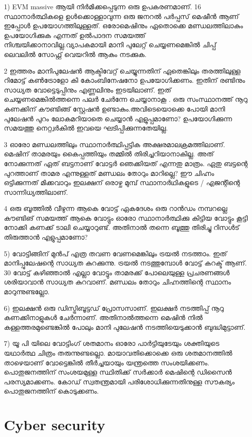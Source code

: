 \documentclass[10pt,a4paper]{report}
\begin{document}
     1) EVM massive ആയി നിർമിക്കപ്പെടുന്ന ഒരു ഉപകരണമാണ്. 16 സ്ഥാനാർത്ഥികളെ ഉൾക്കൊള്ളാവുന്ന ഒരു ജനറൽ പർപ്പസ് മെഷീൻ ആണ് ഇപ്പോൾ ഉപയോഗത്തിലുള്ളത്. ഒരോമെഷിനും ഏതൊക്കെ മണ്ഡലത്തിലാകും ഉപയോഗിക്കുക എന്നത് ഉൽപാദന സമയത്ത് നിശ്ചയിക്കാനാവില്ല.വ്യാപകമായി മാനി പുലേറ്റ് ചെയ്യണമെങ്കിൽ ചിപ്പ് ലെവലിൽ സോഫ്റ്റ് വെയറിൽ ആകും നടക്കുക.
     
      2 ഇത്തരം മാനിപുലേഷൻ ആക്ടിവേറ്റ് ചെയ്യുന്നതിന് ഏതെങ്കിലും തരത്തിലുള്ള റിമോട്ട് കൺട്രോളോ കി കോംബിനേഷനോ ഉപയോഗിക്കണം. ഇതിന് രണ്ടിനും സാധ്യത വോട്ടെടുപ്പിനും എണ്ണലിനും ഇടയിലാണ്. ഇത് ചെയ്യണമെങ്കിൽത്തന്നെ പലർ ചേർന്നേ ചെയ്യാനാകൂ . ഒരു സംസ്ഥാനത്ത് നൂറു കണക്കിന് കൗണ്ടിങ്ങ് സ്റ്റേഷൻ ഉണ്ടാകും.അവിടെയൊക്കെ പോയി മാനി പുലേഷൻ പുറം ലോകമറിയാതെ ചെയ്യാൻ എളുപ്പമാണോ? ഉപയോഗിക്കുന്ന സമയത്തു നെറ്റ്വർകിൽ ഇവയെ ഘടിപ്പിക്കുന്നതേയില്ല. 
      
      3 ഓരോ മണ്ഡലത്തിലും സ്ഥാനാർത്ഥിപ്പട്ടിക അക്ഷരമാലക്രമത്തിലാണ്. മെഷിന് താമരയും കൈപ്പത്തിയും തമ്മിൽ തിരിച്ചറിയാനാകില്ല. അത് നോക്കുന്നത് ഏത് ബട്ടനാണ് വോട്ടർ ഞെക്കിയത് എന്നതു മാത്രം. ഏതു ബട്ടന്റെ പുറത്താണ് താമര എന്നുള്ളത് മണ്ഡലം തോറും മാറില്ലെ? ഈ ചിഹ്നം ഒട്ടിക്കുന്നത് മിക്കവാറും ഇലക്ഷന് ഒരാഴ്ച മുമ്പ് സ്ഥാനാർഥികളുടെ / എജന്റിന്റെ സാന്നിധ്യത്തിലാണ്‌. 
      
      4 ഒരു ബൂത്തിൽ വീഴുന്ന ആകെ വോട്ട് ഏകദേശം ഒരു റാൻഡം നമ്പറല്ലെ കൗണ്ടിങ് സമയത്ത് ആകെ വോട്ടും ഓരോ സ്ഥാനാർത്ഥിക്കു കിട്ടിയ വോട്ടും കൂട്ടി നോക്കി കണക്ക് ടാലി ചെയ്യാറുണ്ട്. അതിനാൽ തന്നെ ബൂത്തു തിരിച്ചു റിസൾട് തിരുത്താൻ എളുപ്പമാണോ? 
      
      5) വോട്ടിങ്ങിന് മുൻപ് എത്ര തവണ വേണമെങ്കിലും ട്രയൽ നടത്താം. ഇത് മാനിപ്പുലേഷന്റെ സാധ്യത കുറക്കുന്നു. ട്രയൽ നടത്തുമ്പോൾ വോട്ട് കറക്ട് ആണ്. 30 വോട്ട് കഴിഞ്ഞാൽ എല്ലാ വോട്ടും താമരക്ക് പോലെയുള്ള പ്രചരണങ്ങൾ ശരിയാവാൻ സാധ്യത കുറവാണ്. മണ്ഡലം തോറും ചിഹ്നത്തിന്റെ സ്ഥാനം മാറുന്നുണ്ടല്ലോ. 
      
      6) ഇലക്ഷൻ ഒരു ഡിസ്ട്രിബൂട്ടഡ് പ്രോസസാണ്. ഇലക്ഷർ നടത്തിപ്പ് നൂറു കണക്കിനാളുകൾ ചേർന്നാണ്. അതിനാൽത്തന്നെ മെഷിൻ നിൽ കള്ളത്തരമുണ്ടെങ്കിൽ പോലും മാനി പുലേഷൻ നടത്തിയെടുക്കാൻ ബുദ്ധിമുട്ടാണ്. 
      
      7) യൂ പി യിലെ വോട്ടിംഗ് ശതമാനം ഓരോ പാർട്ടിയുടേയും ശക്തിയുടെ യഥാർത്ഥ ചിത്രം തരുന്നുണ്ടല്ലൊ. മായാവതിക്കൊക്കെ ഒരു ശതമാനത്തിൽ താഴെയാണ് വോട്ടെങ്കിൽ തീർച്ചയായും യന്ത്രത്തെ സംശയിക്കണം. പൊതുജനത്തിന് സംശയമുള്ള സ്ഥിതിക്ക് സർക്കാർ മെഷിന്റെ ഡിസൈൻ പരസ്യമാക്കണം. കോഡ് സ്വതന്ത്രമായി പരിശോധിക്കുന്നതിനുള്ള സൗകര്യം പൊതുജനത്തിന് കൊടുക്കണം.
  \section{Cyber security}
  
\end{document}
